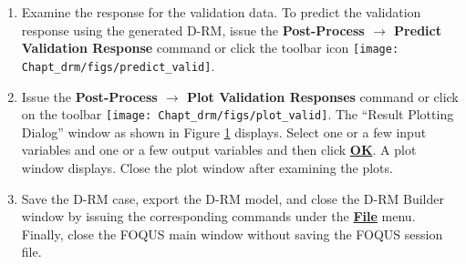 \begin{enumerate}
	\begin{figure}[H]
		\begin{center}
			\texttt{[image: Chapt\_drm/figs/drm\_plot\_train\_dlg\_bfb2]}
			\caption{Dialog Window for Plotting Training Data of Two-Time-Scale BFB Model}
			\label{fig.drm_plot_train_dlg_bfb2}
		\end{center}
	\end{figure}
	Select the input variable ``F\_GasIn'' in the ``Select Input Variables'' list, select the output variable ``CO2\_Removal'' in the ``Select Output Variables'' list, and then click \textbf{\underline{OK}}.  A plot window as show in Figure \ref{fig.drm_plot_train_dlg_bfb2} displays.
	\begin{figure}[H]
		\begin{center}
			\texttt{[image: Chapt\_drm/figs/drm\_plot\_train\_fig\_bfb2]}
			\caption{Response of Training Data of Two-Time-Scale BFB Model}
			\label{fig.drm_plot_train_fig_bfb2}
		\end{center}
	\end{figure}
	Maximize the plot window to see the plots of the output variables clearly.  If the user looks carefully, there are two curves plotted for each output variable.  The one in blue is the high-fidelity model (ACM model) simulation result and the other in red is the D-RM prediction.  It can be seen from the figure that there is a quick response in a few seconds followed by a slow response whenever there is an input step change.  Close the plot window after examining the results for the training sequence.  If needed, issue the \textbf{Post-Process $\rightarrow$ Plot Training Responses} command again to view the plot for other output variables.
	\item Examine the response for the validation data.  To predict the validation response using the generated D-RM, issue the \textbf{Post-Process $\rightarrow$ Predict Validation Response} command or click the toolbar icon \texttt{[image: Chapt\_drm/figs/predict\_valid]}.
	\item Issue the \textbf{Post-Process $\rightarrow$ Plot Validation Responses} command or click on the toolbar \texttt{[image: Chapt\_drm/figs/plot\_valid]}.  The ``Result Plotting Dialog'' window as shown in Figure \ref{fig.drm_plot_train_dlg_bfb2} displays.  Select one or a few input variables and one or a few output variables and then click \textbf{\underline{OK}}.  A plot window displays.  Close the plot window after examining the plots.
	\item Save the D-RM case, export the D-RM model, and close the D-RM Builder window by issuing the corresponding commands under the \textbf{\underline{File}} menu.  Finally, close the FOQUS main window without saving the FOQUS session file.
\end{enumerate}


